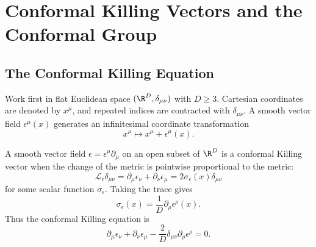 \chapter{Conformal Killing Vectors and the Conformal Group}
\label{ch:volume-iii-conformal-killing-vectors}
\ConventionsEuclideanCFT


\section{The Conformal Killing Equation}

Work first in flat Euclidean space \((\R^D,\delta_{\mu\nu})\) with
\(D\ge3\).  Cartesian coordinates are denoted by \(x^\mu\), and repeated
indices are contracted with \(\delta_{\mu\nu}\).  A smooth vector field
\(\epsilon^\mu(x)\) generates an
infinitesimal coordinate transformation
\[
  x^\mu\longmapsto x^\mu+\epsilon^\mu(x).
\]

\begin{definition}
\label{def:euclidean-conformal-killing-vector}
A smooth vector field \(\epsilon=\epsilon^\mu\partial_\mu\) on an open subset
of \(\R^D\) is a conformal Killing vector when the change of the metric is
pointwise proportional to the metric:
\[
  \mathcal L_\epsilon\delta_{\mu\nu}
  =
  \partial_\mu\epsilon_\nu+\partial_\nu\epsilon_\mu
  =
  2\sigma_\epsilon(x)\delta_{\mu\nu}
\]
for some scalar function \(\sigma_\epsilon\).  Taking the trace gives
\[
  \sigma_\epsilon(x)
  =
  \frac1D\partial_\rho\epsilon^\rho(x).
\]
Thus the conformal Killing equation is
\begin{equation}
  \partial_\mu\epsilon_\nu+\partial_\nu\epsilon_\mu
  -
  \frac2D\delta_{\mu\nu}\partial_\rho\epsilon^\rho
  =
  0.
  \label{eq:conformal-killing-equation}
\end{equation}
\end{definition}

